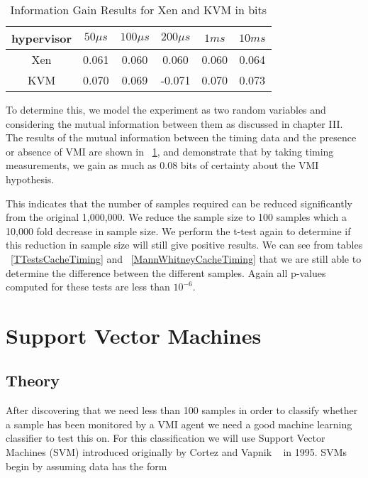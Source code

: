 	\begin{table}\label{InfoGainsCacheAttack}
    \centering
	  	\begin{tabular}{| c | c | c | c | c | c |}
		    \hline
		    hypervisor & $50\mu s$ & $100\mu s$ & $200 \mu s$ & $1ms$ & $10ms$ \\ \hline
		    Xen & 0.061 & 0.060 & 0.060 & 0.060 & 0.064 \\ \hline 
		    KVM & 0.070 & 0.069 & -0.071 & 0.070 & 0.073 \\ \hline   
		\end{tabular}
		\caption{Information Gain Results for Xen and KVM in bits}
  \end{table}



To determine this, we model the experiment as two random variables and considering the mutual information between them as discussed in chapter III. The results of the mutual information between the timing data and the presence or absence of VMI are shown in ~\ref{InfoGainsCacheAttack}, and demonstrate that by taking timing measurements, we gain as much as 0.08 bits of certainty about the VMI hypothesis. 


This indicates that the number of samples required can be reduced significantly from the original 1,000,000. We reduce the sample size to 100 samples which a 10,000 fold decrease in sample size. We perform the t-test again to determine if this reduction in sample size will still give positive results.  We can see from tables ~\ref{TTestsCacheTiming} and ~\ref{MannWhitneyCacheTiming} that we are still able to determine the difference between the different samples. Again all p-values computed for these tests are less than $10^{−6}$. 


\section{Support Vector Machines}

\subsection{Theory}
After discovering that we need less than 100 samples in order to classify whether a sample has been monitored by a VMI agent we need a good machine learning classifier to test this on. For this classification we will use Support Vector Machines (SVM) introduced originally by Cortez and Vapnik ~\cite{cortes1995support} in 1995. SVMs begin by assuming data has the form 


